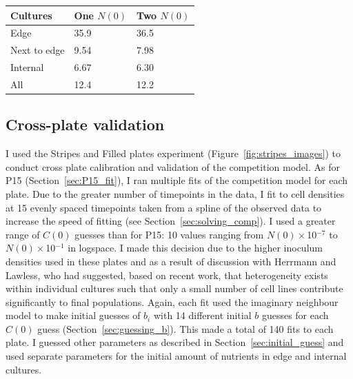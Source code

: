 \begin{multicols}{2}
\begin{center}
  \begin{tabular}{l l l}
    \hline
    Cultures     & One \(N(0)\)  & Two \(N(0)\) \\
    \hline
    Edge         & 35.9    & 36.5\\
    Next to edge & 9.54    & 7.98\\
    Internal     & 6.67    & 6.30\\
    All          & 12.4    & 12.2\\
    \hline
  \end{tabular}
  \label{tab:corner}
\end{center}


\subsection{Cross-plate validation}
\label{sec:cross_plate_val_results}

I used the Stripes and Filled plates experiment
(Figure~\ref{fig:stripes_images}) to conduct cross plate calibration
and validation of the competition model. As for P15
(Section~\ref{sec:P15_fit}), I ran multiple fits of the competition
model for each plate. Due to the greater number of timepoints in the
data, I fit to cell densities at 15 evenly spaced timepoints taken
from a spline of the observed data to increase the speed of fitting
(see Section~\ref{sec:solving_comp}). I used a greater range of
\(C(0)\) guesses than for P15: 10 values ranging from
\(N(0)\times\)10\(^{-7}\) to \(N(0)\times\)10\(^{-1}\) in logspace. I
made this decision due to the higher inoculum densities used in these
plates and as a result of discussion with Herrmann and Lawless, who
had suggested, based on recent work, that heterogeneity exists within
individual cultures such that only a small number of cell lines
contribute significantly to final populations. Again, each fit used
the imaginary neighbour model to make initial guesses of \(b_{i}\)
with 14 different initial \(b\) guesses for each \(C(0)\) guess
(Section~\ref{sec:guessing_b}). This made a total of 140 fits to each
plate. I guessed other parameters as described in
Section~\ref{sec:initial_guess} and used separate parameters for the
initial amount of nutrients in edge and internal cultures.


\end{multicols}
